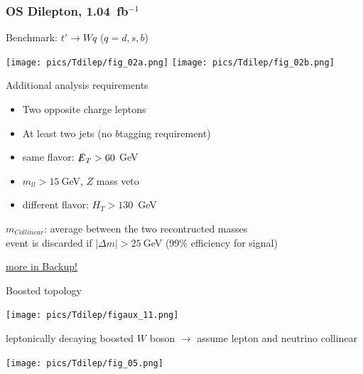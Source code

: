 \documentclass[xcolor=dvipsnames,10pt]{beamer}
\newcommand{\ifb}{~fb$^{-1}$}
\begin{document}
\begin{frame}\frametitle{OS Dilepton, 1.04\ifb~\cite{Aad:2012bt}} %
\footnotesize\centering


\begin{minipage}{.6\textwidth}
\centering

\vspace{\baselineskip}

Benchmark: \alert{$t' \rightarrow Wq$} ($q=d,s,b$)\\

\centering

\texttt{[image: pics/Tdilep/fig\_02a.png]}
\texttt{[image: pics/Tdilep/fig\_02b.png]}


Additional analysis requirements

\scriptsize
\begin{itemize}
\item Two \alert{opposite charge} leptons
\item At least two jets (no $b$tagging requirement)
\item same flavor: $\slashed{E}_T>60~$GeV
\item $m_{ll}>15~$GeV, \alert{$Z$ mass veto}
\item different flavor: $H_T>130$~GeV
\end{itemize}


\vspace{\baselineskip}

\alert{$m_{Collinear}$}: average between the two recontructed masses\\
event is discarded if $|\Delta m|>25~$GeV (99\% efficiency for signal)

\raggedright
\scriptsize \hyperlink{Tdilep}{more in Backup!}

\end{minipage}\begin{minipage}{.4\textwidth}
\centering
\vspace{\baselineskip}

\alert{Boosted topology}

\texttt{[image: pics/Tdilep/figaux\_11.png]}
\scriptsize

leptonically decaying boosted $W$ boson $\rightarrow$ assume \alert{lepton and neutrino collinear}

\vspace{\baselineskip}

\texttt{[image: pics/Tdilep/fig\_05.png]}

\end{minipage}


\end{frame}
\end{document}
